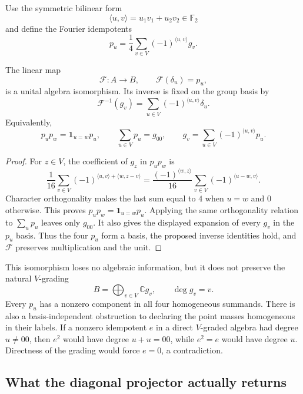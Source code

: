 Use the symmetric bilinear form
\[
 \langle u,v\rangle=u_1v_1+u_2v_2\in\mathbb F_2
\]
and define the Fourier idempotents
\[
 p_u=\frac14\sum_{v\in V}(-1)^{\langle u,v\rangle}g_v.
\]

\begin{theorem}
\label{thm:chatnotes-fourier-algebra-isomorphism}
The linear map
\[
 \mathcal F:A\longrightarrow B,
 \qquad \mathcal F(\delta_u)=p_u,
\]
is a unital algebra isomorphism.  Its inverse is fixed on the group basis by
\[
 \mathcal F^{-1}(g_v)
 =\sum_{u\in V}(-1)^{\langle u,v\rangle}\delta_u.
\]
Equivalently,
\[
 p_up_w=\mathbf 1_{u=w}p_u,
 \qquad
 \sum_{u\in V}p_u=g_{00},
 \qquad
 g_v=\sum_{u\in V}(-1)^{\langle u,v\rangle}p_u.
\]
\end{theorem}

\begin{proof}
For $z\in V$, the coefficient of $g_z$ in $p_up_w$ is
\[
 \frac1{16}\sum_{v\in V}
 (-1)^{\langle u,v\rangle+\langle w,z-v\rangle}
 =\frac{(-1)^{\langle w,z\rangle}}{16}
   \sum_{v\in V}(-1)^{\langle u-w,v\rangle}.
\]
Character orthogonality makes the last sum equal to $4$ when $u=w$ and
$0$ otherwise.  This proves $p_up_w=\mathbf 1_{u=w}p_u$.
Applying the same orthogonality relation to $\sum_up_u$ leaves only $g_{00}$.
It also gives the displayed expansion of every $g_v$ in the $p_u$ basis.
Thus the four $p_u$ form a basis, the proposed inverse identities hold, and
$\mathcal F$ preserves multiplication and the unit.
\end{proof}

This isomorphism loses no algebraic information, but it does not preserve the
natural $V$-grading
\[
 B=\bigoplus_{v\in V}\mathbb Cg_v,
 \qquad \deg g_v=v.
\]
Every $p_u$ has a nonzero component in all four homogeneous summands.
There is also a basis-independent obstruction to declaring the point masses
homogeneous in their labels.  If a nonzero idempotent $e$ in a direct
$V$-graded algebra had degree $u\ne00$, then $e^2$ would have degree
$u+u=00$, while $e^2=e$ would have degree $u$.  Directness of the grading
would force $e=0$, a contradiction.

\subsection{What the diagonal projector actually returns}

